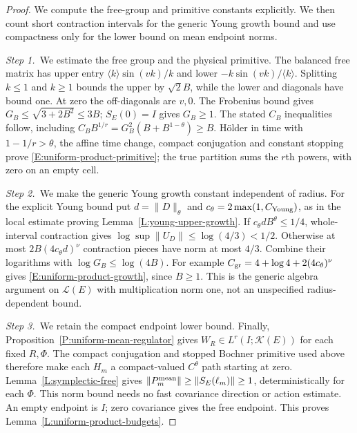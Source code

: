 \begin{proof}
  We compute the free-group and primitive constants explicitly. We then count
  short contraction intervals for the generic Young growth bound and use
  compactness only for the lower bound on mean endpoint norms.


  \medskip
  \noindent\textit{Step 1.~}We estimate the free group and the physical
  primitive.
  The balanced free matrix has upper entry $\langle k\rangle\sin(vk)/k$ and
  lower $-k\sin(vk)/\langle k\rangle$. Splitting $k \le 1$ and $k \ge 1$ bounds
  the upper by $\sqrt2 B$, while the lower and diagonals have bound one. At zero
  the off-diagonals are $v,0$. The Frobenius bound gives $G_B \le \sqrt{3+2B^2}
  \le 3B$; $S_E(0) = I$ gives $G_B \ge 1$. The stated $C_B$ inequalities follow,
  including $C_BB^{1/r} = G_B^2(B+B^{1-\theta}) \ge B$. H\"older in time with
  $1-1/r > \theta$, the affine time change, compact conjugation and constant
  stopping prove \eqref{E:uniform-product-primitive}; the true partition sums
  the $r$th powers, with zero on an empty cell.


  \medskip
  \noindent\textit{Step 2.~}We make the generic Young growth constant
  independent of radius.
  For the explicit Young bound put $d = \|D\|_\theta$ and $c_\theta =
  2\max(1,C_{\rm Young})$, as in the local estimate proving
  Lemma~\ref{L:young-upper-growth}. If $c_\theta dB^\theta \le 1/4$,
  whole-interval contraction gives $\log\sup\|U_D\| \le \log(4/3) < 1/2$.
  Otherwise at most $2B(4c_\theta d)^\nu$ contraction pieces have norm at most
  $4/3$. Combine their logarithms with $\log G_B \le \log(4B)$. For example
  $C_{\rm gr} = 4+\log4+2(4c_\theta)^\nu$ gives
  \eqref{E:uniform-product-growth}, since $B \ge 1$. This is the generic algebra
  argument on $\mathcal{L}(E)$ with multiplication norm one, not an unspecified
  radius-dependent bound.


  \medskip
  \noindent\textit{Step 3.~}We retain the compact endpoint lower bound.
  Finally, Proposition~\ref{P:uniform-mean-regulator} gives $W_R \in
  L^r(I;\mathcal{K}(E))$ for each fixed $R,\Phi$. The compact conjugation and
  stopped Bochner primitive used above therefore make each $H_m$ a
  compact-valued $C^\theta$ path starting at zero. Lemma~\ref{L:symplectic-free}
  gives $\|P_m^{\rm mean}\| \ge \|S_E(\ell_m)\| \ge 1$, deterministically for
  each $\Phi$. This norm bound needs no fast covariance direction or action
  estimate. An empty endpoint is $I$; zero covariance gives the free endpoint.
  This proves Lemma~\ref{L:uniform-product-budgets}.
\end{proof}

